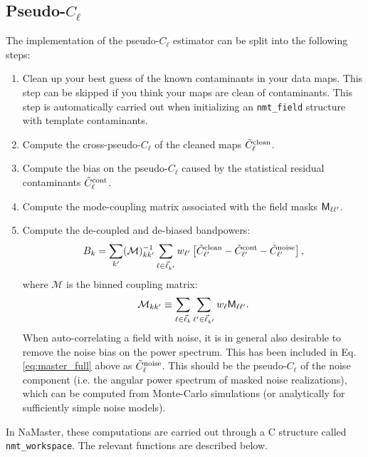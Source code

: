 \documentclass[a4paper,10pt]{article}
\begin{document}
\subsection{Pseudo-$C_\ell$}
The implementation of the pseudo-$C_\ell$ estimator can be split into the following steps:
\begin{enumerate}
  \item Clean up your best guess of the known contaminants in your data maps. This step can be skipped if you think your maps are clean of contaminants. This step is automatically carried out when initializing an {\tt nmt\_field} structure with template contaminants.
  \item Compute the cross-pseudo-$C_\ell$ of the cleaned maps $\tilde{C}^{\rm clean}_\ell$.
  \item Compute the bias on the pseudo-$C_\ell$ caused by the statistical residual contaminants $\tilde{C}^{\rm cont}_\ell$.
  \item Compute the mode-coupling matrix associated with the field masks ${\sf M}_{\ell\ell'}$.
  \item Compute the de-coupled and de-biased bandpowers:
        \begin{equation}\label{eq:master_full}
          B_k=\sum_{k'}(\mathcal{M})^{-1}_{kk'}\sum_{\ell\in\vec{\ell}_{k'}}w_{\ell'}\left[\tilde{C}^{\rm clean}_{\ell'}-\tilde{C}^{\rm cont}_{\ell'}-\tilde{C}^{\rm noise}_{\ell'}\right],
        \end{equation}
        where $\mathcal{M}$ is the binned coupling matrix:
        \begin{equation}
          \mathcal{M}_{kk'}\equiv\sum_{\ell\in\vec{\ell}_k}\sum_{\ell'\in\vec{\ell}_{k'}}w_\ell{\sf M}_{\ell\ell'}.
        \end{equation}
        When auto-correlating a field with noise, it is in general also desirable to remove the noise bias on the power spectrum. This has been included in Eq. \ref{eq:master_full} above as $\tilde{C}^{\rm noise}_\ell$. This should be the pseudo-$C_\ell$ of the noise component (i.e. the angular power spectrum of masked noise realizations), which can be computed from Monte-Carlo simulations (or analytically for sufficiently simple noise models).
\end{enumerate}
In NaMaster, these computations are carried out through a C structure called {\tt nmt\_workspace}. The relevant functions are described below.
\end{document}
